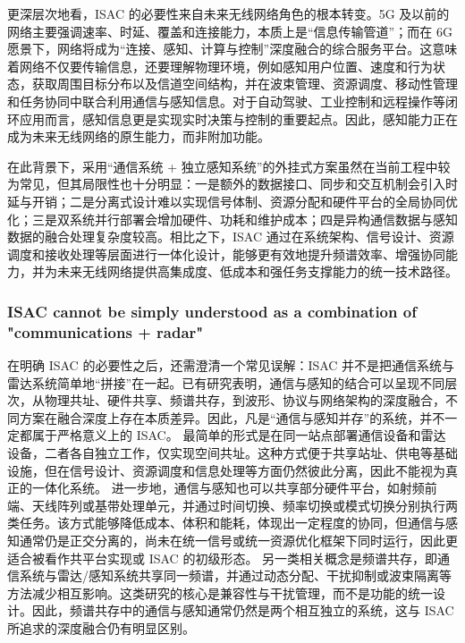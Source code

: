 更深层次地看，ISAC 的必要性来自未来无线网络角色的根本转变。5G 及以前的网络主要强调速率、时延、覆盖和连接能力，本质上是“信息传输管道”；而在 6G 愿景下，网络将成为“连接、感知、计算与控制”深度融合的综合服务平台\cite{Liu2022ISAC,Zhang2021ISAC6G}。这意味着网络不仅要传输信息，还要理解物理环境，例如感知用户位置、速度和行为状态，获取周围目标分布以及信道空间结构，并在波束管理、资源调度、移动性管理和任务协同中联合利用通信与感知信息。对于自动驾驶、工业控制和远程操作等闭环应用而言，感知信息更是实现实时决策与控制的重要起点。因此，感知能力正在成为未来无线网络的原生能力，而非附加功能。

在此背景下，采用“通信系统 + 独立感知系统”的外挂式方案虽然在当前工程中较为常见，但其局限性也十分明显：一是额外的数据接口、同步和交互机制会引入时延与开销；二是分离式设计难以实现信号体制、资源分配和硬件平台的全局协同优化；三是双系统并行部署会增加硬件、功耗和维护成本；四是异构通信数据与感知数据的融合处理复杂度较高\cite{Liu2022ISAC,Hassanien2015dual}。相比之下，ISAC 通过在系统架构、信号设计、资源调度和接收处理等层面进行一体化设计，能够更有效地提升频谱效率、增强协同能力，并为未来无线网络提供高集成度、低成本和强任务支撑能力的统一技术路径。

\subsubsection{ISAC cannot be simply understood as a combination of "communications + radar"}
\label{subsubsec:ch1-isac-not-simple-combination}

在明确 ISAC 的必要性之后，还需澄清一个常见误解：ISAC 并不是把通信系统与雷达系统简单地“拼接”在一起。已有研究表明，通信与感知的结合可以呈现不同层次，从物理共址、硬件共享、频谱共存，到波形、协议与网络架构的深度融合，不同方案在融合深度上存在本质差异\cite{Liu2022ISAC,Zhang2021ISAC6G}。因此，凡是“通信与感知并存”的系统，并不一定都属于严格意义上的 ISAC。
最简单的形式是在同一站点部署通信设备和雷达设备，二者各自独立工作，仅实现空间共址。这种方式便于共享站址、供电等基础设施，但在信号设计、资源调度和信息处理等方面仍然彼此分离，因此不能视为真正的一体化系统。
进一步地，通信与感知也可以共享部分硬件平台，如射频前端、天线阵列或基带处理单元，并通过时间切换、频率切换或模式切换分别执行两类任务。该方式能够降低成本、体积和能耗，体现出一定程度的协同，但通信与感知通常仍是正交分离的，尚未在统一信号或统一资源优化框架下同时运行，因此更适合被看作共平台实现或 ISAC 的初级形态\cite{Hassanien2015dual}。
另一类相关概念是频谱共存，即通信系统与雷达/感知系统共享同一频谱，并通过动态分配、干扰抑制或波束隔离等方法减少相互影响\cite{Liu2020JointRadarComm}。这类研究的核心是兼容性与干扰管理，而不是功能的统一设计。因此，频谱共存中的通信与感知通常仍然是两个相互独立的系统，这与 ISAC 所追求的深度融合仍有明显区别\cite{Liu2022ISAC}。


